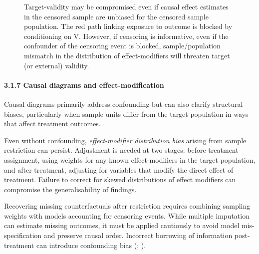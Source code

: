 \documentclass[
  singlecolumn]{article}
\let\oldparagraph\paragraph
\renewcommand{\paragraph}[1]{\oldparagraph{#1}\mbox{}}
\begin{document}
\begin{figure}


\caption{\label{fig-experiment-selection-collider-adjustment-measured}Target-validity
may be compromised even if causal effect estimates in the censored
sample are unbiased for the censored sample population. The red path
linking exposure to outcome is blocked by conditioning on V. However, if
censoring is informative, even if the confounder of the censoring event
is blocked, sample/population mismatch in the distribution of
effect-modifiers will threaten target (or external) validity.}

\end{figure}%

\paragraph{3.1.7 Causal diagrams and
effect-modification}\label{causal-diagrams-and-effect-modification}

Causal diagrams primarily address confounding but can also clarify
structural biases, particularly when sample units differ from the target
population in ways that affect treatment outcomes.

Even without confounding, \emph{effect-modifier distribution bias}
arising from sample restriction can persist. Adjustment is needed at two
stages: before treatment assignment, using weights for any known
effect-modifiers in the target population, and after treatment,
adjusting for variables that modify the direct effect of treatment.
Failure to correct for skewed distributions of effect modifiers can
compromise the generalisability of findings.

Recovering missing counterfactuals after restriction requires combining
sampling weights with models accounting for censoring events. While
multiple imputation can estimate missing outcomes, it must be applied
cautiously to avoid model mis-specification and preserve causal order.
Incorrect borrowing of information post-treatment can introduce
confounding bias (; ).
\end{document}
